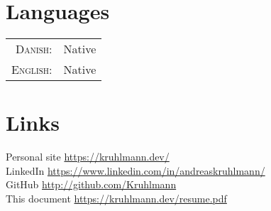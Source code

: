 \documentclass[a4paper,10pt]{article}
\begin{document}
\section{Languages}
\begin{tabular}{rl}
	\textsc{Danish:}  & Native \\
	\textsc{English:} & Native \\
\end{tabular}

\section{Links}
Personal site \href{https://kruhlmann.dev/}{https://kruhlmann.dev/}\\
LinkedIn \href{https://www.linkedin.com/in/andreaskruhlmann/}{https://www.linkedin.com/in/andreaskruhlmann/}\\
GitHub  \href{https://github.com/Kruhlmann}{http://github.com/Kruhlmann} \\
This document \href{https://kruhlmann.dev/resume.pdf}{https://kruhlmann.dev/resume.pdf}\\
\end{document}
